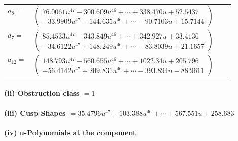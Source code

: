 \documentclass[1p]{elsarticle_modified}
\theoremstyle{definition}
\begin{document}
\begin{tabular}{m{7pt} m{180pt} m{7pt} m{180pt} }
\flushright $a_{8}=$&$\begin{pmatrix}76.0061 u^{47}-300.609 u^{46}+\cdots+338.470 u+52.5437\\-33.9909 u^{47}+144.635 u^{46}+\cdots-90.7103 u+15.7144\end{pmatrix}$ \\
\flushright $a_{7}=$&$\begin{pmatrix}85.4533 u^{47}-343.849 u^{46}+\cdots+342.927 u+33.4136\\-34.6122 u^{47}+148.249 u^{46}+\cdots-83.8039 u+21.1657\end{pmatrix}$ \\
\flushright $a_{12}=$&$\begin{pmatrix}148.793 u^{47}-560.655 u^{46}+\cdots+1022.34 u+205.796\\-56.4142 u^{47}+209.831 u^{46}+\cdots-393.894 u-88.9611\end{pmatrix}$\\&\end{tabular}
\flushleft \textbf{(ii) Obstruction class $= 1$}\\~\\
\flushleft \textbf{(iii) Cusp Shapes $= 35.4796 u^{47}-103.388 u^{46}+\cdots+567.551 u+258.683$}\\~\\
\newpage\renewcommand{\arraystretch}{1}
\flushleft \textbf{(iv) u-Polynomials at the component}\newline \\
\end{document}
